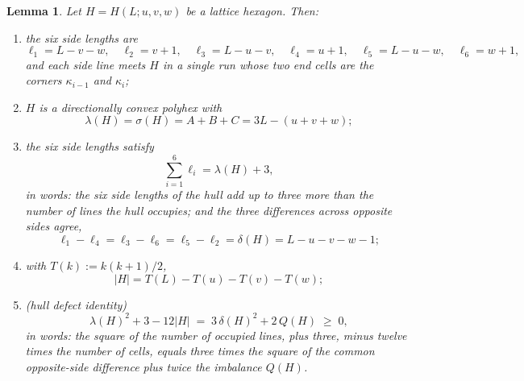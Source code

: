 \documentclass[11pt]{article}
\theoremstyle{plain}
\newtheorem{lemma}[theorem]{Lemma}
\theoremstyle{definition}
\theoremstyle{remark}
\begin{document}
\begin{lemma}\label{lem:hex}
Let \(H=H(L;u,v,w)\) be a lattice hexagon. Then:
\begin{enumerate}
\item[(i)] the six side lengths are
\[
   \ell_{1}=L-v-w,\quad \ell_{2}=v+1,\quad \ell_{3}=L-u-v,\quad
   \ell_{4}=u+1,\quad \ell_{5}=L-u-w,\quad \ell_{6}=w+1 ,
\]
and each side line meets \(H\) in a single run whose two end cells are the corners
\(\kappa_{i-1}\) and \(\kappa_{i}\);
\item[(ii)] \(H\) is a directionally convex polyhex with
\[
   \lambda(H)=\sigma(H)=A+B+C=3L-(u+v+w);
\]
\item[(iii)] the six side lengths satisfy
\begin{equation}\label{eq:sidesum}
   \sum_{i=1}^{6}\ell_{i}=\lambda(H)+3 ,
\end{equation}
in words: the six side lengths of the hull add up to three more than the number of lines
the hull occupies; and the three differences across opposite sides agree,
\begin{equation}\label{eq:delta}
   \ell_{1}-\ell_{4}=\ell_{3}-\ell_{6}=\ell_{5}-\ell_{2}=\delta(H)=L-u-v-w-1 ;
\end{equation}
\item[(iv)] with \(T(k):=k(k+1)/2\),
\[
   |H|=T(L)-T(u)-T(v)-T(w) ;
\]
\item[(v)] \textup{(hull defect identity)}
\begin{equation}\label{eq:defectid}
   \lambda(H)^{2}+3-12|H| \;=\; 3\,\delta(H)^{2}+2\,Q(H)\;\ge\;0 ,
\end{equation}
in words: the square of the number of occupied lines, plus three, minus twelve times the
number of cells, equals three times the square of the common opposite-side difference plus
twice the imbalance \(Q(H)\).
\end{enumerate}
\end{lemma}
\end{document}
